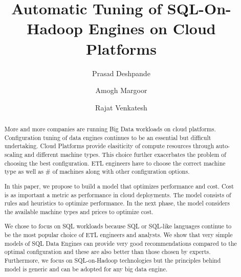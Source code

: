 \documentclass[sigconf]{acmart}
\begin{document}
\title{Automatic Tuning of SQL-On-Hadoop Engines on Cloud Platforms}

\author{Prasad Deshpande}

\author{Amogh Margoor}

\author{Rajat Venkatesh}

\renewcommand{\shortauthors}{P. Deshpande et al.}


\begin{abstract}
More and more companies are running Big Data workloads on cloud platforms. Configuration tuning of data engines continues to be an essential but difficult undertaking. Cloud Platforms provide elasiticity of compute resources through auto-scaling and different machine types. This choice further exacerbates the problem of choosing the best configuration. ETL engineers have to choose the correct machine type as well as \# of machines along with other configuration options.

In this paper, we propose to build a model that optimizes performance and cost. Cost is as important a metric as performance in cloud deployments. The model consists of rules and heuristics to optimize performance. In the next phase, the model considers the available machine types and prices to optimize cost. 

We chose to focus on SQL workloads because SQL or SQL-like languages continue to be the most popular choice of ETL engineers and analysts. We show that very simple models of SQL Data Engines can provide very good recommendations compared to the optimal configuration and these are also better than those chosen by experts. Furthermore, we focus on SQL-on-Hadoop technologies but the principles behind model is generic and can be adopted for any big data engine. 
\end{abstract}



\maketitle








 
\end{document}

